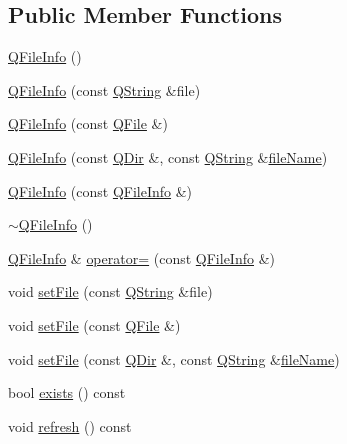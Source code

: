 \subsection*{Public Member Functions}
\begin{DoxyCompactItemize}
\item 
\mbox{\hyperlink{class_q_file_info_a7cfa76234a4b4c22f071a41452c5f7df}{Q\+File\+Info}} ()
\item 
\mbox{\hyperlink{class_q_file_info_a0b6a4788de6ee6c2b66a0841cd212bbe}{Q\+File\+Info}} (const \mbox{\hyperlink{class_q_string}{Q\+String}} \&file)
\item 
\mbox{\hyperlink{class_q_file_info_a33f5eaacd649938cf6a915817384c1f4}{Q\+File\+Info}} (const \mbox{\hyperlink{class_q_file}{Q\+File}} \&)
\item 
\mbox{\hyperlink{class_q_file_info_a6d57e31d5a4a8e6b6d405d2dd68641b5}{Q\+File\+Info}} (const \mbox{\hyperlink{class_q_dir}{Q\+Dir}} \&, const \mbox{\hyperlink{class_q_string}{Q\+String}} \&\mbox{\hyperlink{class_q_file_info_a4f6795e14c6dc89e4a54d7b5cad9d03f}{file\+Name}})
\item 
\mbox{\hyperlink{class_q_file_info_ab147e0bd29337bd3d8d911c5666a941a}{Q\+File\+Info}} (const \mbox{\hyperlink{class_q_file_info}{Q\+File\+Info}} \&)
\item 
\mbox{\hyperlink{class_q_file_info_a37e6d4bbfffdd1b9d055923f3f0f4d7c}{$\sim$\+Q\+File\+Info}} ()
\item 
\mbox{\hyperlink{class_q_file_info}{Q\+File\+Info}} \& \mbox{\hyperlink{class_q_file_info_aa2a8e3037097440bf77f07d1c51f0369}{operator=}} (const \mbox{\hyperlink{class_q_file_info}{Q\+File\+Info}} \&)
\item 
void \mbox{\hyperlink{class_q_file_info_a6215e0e8c9466ee7db82c13259655b98}{set\+File}} (const \mbox{\hyperlink{class_q_string}{Q\+String}} \&file)
\item 
void \mbox{\hyperlink{class_q_file_info_a9a90b344f26a58641fa784efbaa3ce6e}{set\+File}} (const \mbox{\hyperlink{class_q_file}{Q\+File}} \&)
\item 
void \mbox{\hyperlink{class_q_file_info_a12f26e174efbe009fbda56c5344db89a}{set\+File}} (const \mbox{\hyperlink{class_q_dir}{Q\+Dir}} \&, const \mbox{\hyperlink{class_q_string}{Q\+String}} \&\mbox{\hyperlink{class_q_file_info_a4f6795e14c6dc89e4a54d7b5cad9d03f}{file\+Name}})
\item 
bool \mbox{\hyperlink{class_q_file_info_af7a247c24ea455875293d6406db652a4}{exists}} () const
\item 
void \mbox{\hyperlink{class_q_file_info_a2e046cd4da1f8804c9f39e05921232c5}{refresh}} () const

\end{DoxyCompactItemize}
